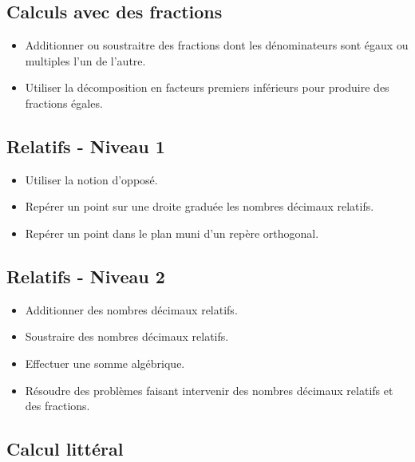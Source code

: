 \documentclass[a4paper,12pt,fleqn]{article}
\begin{document}
\subsection*{Calculs avec des fractions}

\begin{itemize}
	\item {}	Additionner ou soustraitre des fractions dont les dénominateurs sont égaux ou multiples l’un de l’autre.
	\item {}	Utiliser la décomposition en facteurs premiers inférieurs pour produire des fractions égales.
\end{itemize}

\subsection*{Relatifs - Niveau 1}

\begin{itemize}
	\item {}	Utiliser la notion d'opposé.
	\item {}	Repérer un point sur une droite graduée les nombres décimaux relatifs.
	\item {}	Repérer un point dans le plan muni d’un repère orthogonal.
\end{itemize}

\subsection*{Relatifs - Niveau 2}

\begin{itemize}																																								
	\item {}	Additionner des nombres décimaux relatifs.
	\item {}	Soustraire des nombres décimaux relatifs.
	\item {}	Effectuer une somme algébrique.
	\item {}	Résoudre des problèmes faisant intervenir des nombres décimaux relatifs et des fractions. %
\end{itemize}

\subsection*{Calcul littéral}
\end{document}
